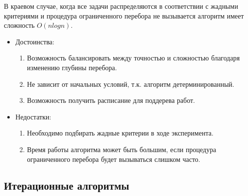 В краевом случае, когда все задачи распределяются в соответствии с жадными критериями и процедура ограниченного перебора не вызывается алгоритм имеет сложность $O(nlogn)$.

\begin{itemize}
    \item Достоинства:
          \begin{enumerate}
              \item Возможность балансировать между точностью и сложностью благодаря изменению глубины перебора.
              \item Не зависит от начальных условий, т.к. алгоритм детерминированный.
              \item Возможность получить расписание для поддерева работ.
          \end{enumerate}
    \item Недостатки:
          \begin{enumerate}
              \item Необходимо подбирать жадные критерии в ходе эксперимента.
              \item Время работы алгоритма может быть большим, если процедура ограниченного перебора будет вызываться слишком часто.
          \end{enumerate}
\end{itemize}

\subsection{Итерационные алгоритмы}

